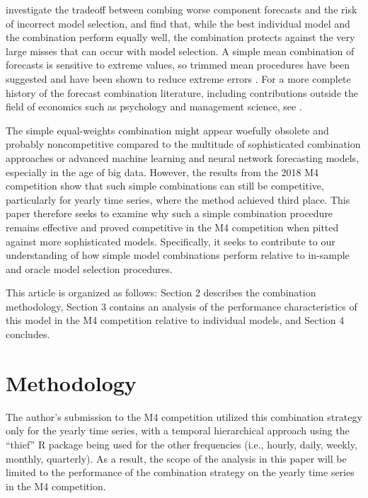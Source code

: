 \documentclass[11pt,3p,review,authoryear]{elsarticle}
\begin{document}
\cite{HIBON2005} investigate the tradeoff between combing worse component forecasts and the risk of incorrect model selection, and find that, while the best individual model and the combination perform equally well, the combination protects against the very large misses that can occur with model selection. A simple mean combination of forecasts is sensitive to extreme values, so trimmed mean procedures have been suggested and have been shown to reduce extreme errors \citep{JOSE2008}. For a more complete history of the forecast combination literature, including contributions outside the field of economics such as psychology and management science, see \cite{CLEMEN1988}.

The simple equal-weights combination might appear woefully obsolete and probably noncompetitive compared to the multitude of sophisticated combination approaches or advanced machine learning and neural network forecasting models, especially in the age of big data. However, the results from the 2018 M4 competition \citep{M4} show that such simple combinations can still be competitive, particularly for yearly time series, where the method achieved third place. This paper therefore seeks to examine why such a simple combination procedure remains effective and proved competitive in the M4 competition when pitted against more sophisticated models. Specifically, it seeks to contribute to our understanding of how simple model combinations perform relative to in-sample and oracle model selection procedures.

This article is organized as follows: Section 2 describes the combination methodology, Section 3 contains an analysis of the performance characteristics of this model in the M4 competition relative to individual models, and Section 4 concludes.


\section{Methodology}
The author's submission to the M4 competition utilized this combination strategy only for the yearly time series, with a temporal hierarchical approach using the ``thief'' R package \citep{ATHANASOPOULOS201760} being used for the other frequencies (i.e., hourly, daily, weekly, monthly, quarterly). As a result, the scope of the analysis in this paper will be limited to the performance of the combination strategy on the yearly time series in the M4 competition.
\end{document}
